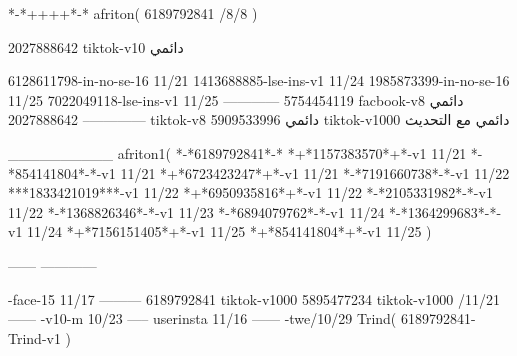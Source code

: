 *-*++++*-*
afriton(
6189792841 /8/8
)

2027888642 tiktok-v10
دائمي

6128611798-in-no-se-16 11/21
1413688885-lse-ins-v1 11/24
1985873399-in-no-se-16 11/25
7022049118-lse-ins-v1 11/25
------------
5754454119 facbook-v8
دائمي
--------------
2027888642 tiktok-v8
دائمي
5909533996 tiktok-v1000
دائمي مع التحديث

__________
afriton1(
*-*6189792841*-*
*+*1157383570*+*-v1 11/21
*-*854141804*-*-v1 11/21
*+*6723423247*+*-v1 11/21
*-*7191660738*-*-v1 11/22
***1833421019***-v1 11/22
*+*6950935816*+*-v1 11/22
*-*2105331982*-*-v1 11/22
*-*1368826346*-*-v1 11/23
*-*6894079762*-*-v1 11/24
*-*1364299683*-*-v1 11/24
*+*7156151405*+*-v1 11/25
*+*854141804*+*-v1 11/25
)

------
------------

-face-15 11/17
---------
6189792841 tiktok-v1000
5895477234 tiktok-v1000 /11/21
------
-v10-m 10/23
-----
userinsta 11/16
------
-twe/10/29
Trind(
6189792841-Trind-v1 
)
